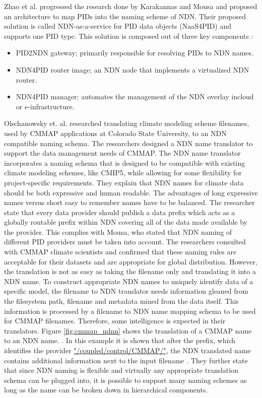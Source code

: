 Zhao et al. progressed the research done by Karakannas \cite{icn-bd} and Mousa \cite{ndn-app-aware} and proposed an architecture to map PIDs into the naming scheme of NDN. Their proposed solution is called NDN-as-a-service for PID data objects (NaaS4PID) and supports one PID type. This solution is composed out of three key components \cite{icn-resteam}:
\begin{itemize}
  \item PID2NDN gateway; primarily responsible for resolving PIDs to NDN names.
  \item NDN4PID router image; an NDN node that implements a virtualized NDN router.
  \item NDN4PID manager; automates the management of the NDN overlay in\newline cloud or e-infrastructure.
\end{itemize}

Olschanowsky et. al. researched translating climate modeling scheme filenames, used by CMMAP applications at Colorado State University, to an NDN compatible 
naming schema. The researchers designed a NDN name translator to support the data management needs of CMMAP. The NDN name translator incorporates a naming schema that is designed to be compatible with existing climate modeling schemes, like CMIP5, while allowing for some flexibility for project-specific requirements. They explain that NDN names for climate data should be both expressive and human readable. The advantages of long expressive names versus short easy to remember names have to be balanced.
The researcher state that every data provider should publish a data prefix which acts as a globally
routable prefix within NDN covering all of the data made available by the provider. This complies with Mousa, who stated that NDN naming of different PID providers must be taken into account. The researchers consulted with CMMAP climate scientists and confirmed that these naming rules are acceptable for their datasets and are appropriate for global distribution. 
However, the translation is not as easy as taking the filename only and translating it into a NDN name. To construct appropriate NDN names to uniquely identify data of a specific model, the filename to NDN translator needs information gleaned from the filesystem path, filename and metadata mined from the data itself. This information is processed by a filename to NDN name mapping schema to be used for CMMAP filenames. Therefore, some intelligence is expected in their translators.
Figure \ref{fig:cmmap_ndnn} shows the translation of a CMMAP name to an NDN name. . In this example it is shown that after the prefix, which identifies the provider \url{"/coupled/control/CMMAP/"}, the NDN translated name contains additional information next to the input filename \cite{ndn-clim}.
They further state that since NDN naming is flexible and virtually any appropriate
translation schema can be plugged into, it is possible to support many naming schemes as long as the 
name can be broken down in hierarchical components.

